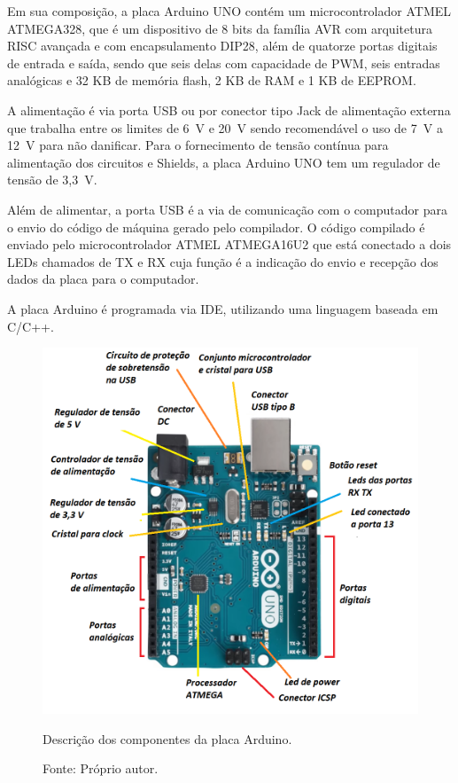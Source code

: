 Em sua composição, a placa Arduino UNO contém um microcontrolador ATMEL ATMEGA328, que é um dispositivo 
de 8 bits da família AVR com arquitetura \ac{RISC} avançada e com encapsulamento DIP28, além de quatorze portas 
digitais de entrada e saída, sendo que seis delas com capacidade de \ac{PWM}, seis 
entradas analógicas e 32 KB de memória flash, 2 KB de \ac{RAM} e 1 KB de \ac{EEPROM}. 

A alimentação é via porta \ac{USB} ou por conector tipo Jack de alimentação externa que trabalha entre os 
limites de 6~V e 20~V sendo recomendável o uso de 7~V a 12~V para não danificar. Para o fornecimento 
de tensão contínua para alimentação dos circuitos e Shields, a placa Arduino UNO tem um regulador 
de tensão de 3,3~V.

Além de alimentar, a porta \ac{USB} é a via de comunicação com o computador para o envio do código de máquina 
gerado pelo compilador. O código compilado é enviado pelo microcontrolador ATMEL ATMEGA16U2 que está 
conectado a dois LEDs chamados de TX e RX cuja função é a indicação do envio e recepção dos dados da 
placa para o computador.

A placa Arduino é programada via \ac{IDE}, utilizando uma linguagem baseada em C/C++.

\begin{figure}[!htb]
\centering
\includegraphics[scale = 0.5]{figuras/placaarduino}
\caption{Descrição dos componentes da placa Arduino.}
\caption*{Fonte: Próprio autor.}
\label{fig:placaarduino}
\end{figure}
    
